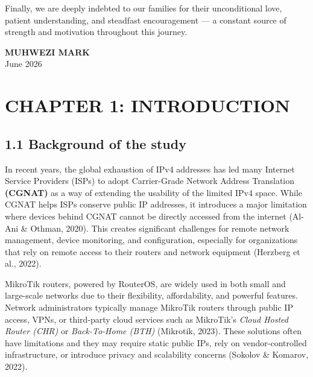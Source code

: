 \documentclass[12pt,a4paper,oneside]{report}
\begin{document}
Finally, we are deeply indebted to our families for their unconditional love, patient understanding, and steadfast encouragement --- a constant source of strength and motivation throughout this journey.

\vspace{1.5cm}
\noindent
\textbf{MUHWEZI MARK}\\
June 2026

\clearpage
\listoffigures
{}

\clearpage
\listoftables
{}

\clearpage
\tableofcontents

\clearpage
\chapter{CHAPTER 1: INTRODUCTION}

\section{1.1 Background of the study}

In recent years, the global exhaustion of IPv4 addresses has led many Internet Service Providers (ISPs) to adopt Carrier-Grade Network Address Translation \textbf{(CGNAT)} as a way of extending the usability of the limited IPv4 space. While CGNAT helps ISPs conserve public IP addresses, it introduces a major limitation where devices behind CGNAT cannot be directly accessed from the internet (Al-Ani \& Othman, 2020). This creates significant challenges for remote network management, device monitoring, and configuration, especially for organizations that rely on remote access to their routers and network equipment (Herzberg et al., 2022).

MikroTik routers, powered by RouterOS, are widely used in both small and large-scale networks due to their flexibility, affordability, and powerful features. Network administrators typically manage MikroTik routers through public IP access, VPNs, or third-party cloud services such as MikroTik's \textit{Cloud Hosted Router (CHR)} or \textit{Back-To-Home (BTH)} (Mikrotik, 2023). These solutions often have limitations and they may require static public IPs, rely on vendor-controlled infrastructure, or introduce privacy and scalability concerns (Sokolov \& Komarov, 2022).
\end{document}
